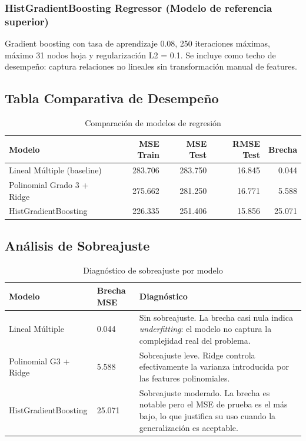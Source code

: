 \documentclass[12pt,a4paper]{article}
\begin{document}
\subsubsection{HistGradientBoosting Regressor (Modelo de referencia superior)}

Gradient boosting con tasa de aprendizaje 0.08, 250 iteraciones m\'aximas,
m\'aximo 31 nodos hoja y regularizaci\'on L2 = 0.1.
Se incluye como techo de desempe\~no: captura relaciones no lineales sin
transformaci\'on manual de features.

\subsection{Tabla Comparativa de Desempe\~no}

\begin{table}[H]
\centering
\caption{Comparaci\'on de modelos de regresi\'on}
\begin{tabular}{lrrrr}
\toprule
\textbf{Modelo} & \textbf{MSE Train} & \textbf{MSE Test} & \textbf{RMSE Test} &
  \textbf{Brecha} \\
\midrule
Lineal M\'ultiple (baseline)      & 283.706 & 283.750 & 16.845 &  0.044 \\
Polinomial Grado 3 + Ridge        & 275.662 & 281.250 & 16.771 &  5.588 \\
HistGradientBoosting              & 226.335 & 251.406 & 15.856 & 25.071 \\
\bottomrule
\end{tabular}
\end{table}

\subsection{An\'alisis de Sobreajuste}

\begin{table}[H]
\centering
\caption{Diagn\'ostico de sobreajuste por modelo}
\small
\begin{tabular}{p{4.2cm}p{2.4cm}p{6.6cm}}
\toprule
\textbf{Modelo} & \textbf{Brecha MSE} & \textbf{Diagn\'ostico} \\
\midrule
Lineal M\'ultiple &
  0.044 &
  Sin sobreajuste. La brecha casi nula indica \emph{underfitting}: el modelo no captura
  la complejidad real del problema. \\[6pt]
Polinomial G3 + Ridge &
  5.588 &
  Sobreajuste leve. Ridge controla efectivamente la varianza introducida por las
  features polinomiales. \\[6pt]
HistGradientBoosting &
  25.071 &
  Sobreajuste moderado. La brecha es notable pero el MSE de prueba es el m\'as bajo,
  lo que justifica su uso cuando la generalizaci\'on es aceptable. \\
\bottomrule
\end{tabular}
\end{table}
\end{document}
